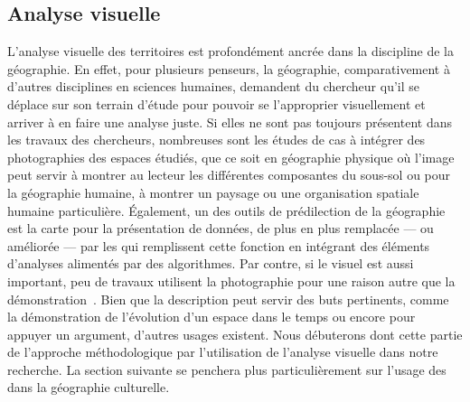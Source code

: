 \subsection{Analyse visuelle}
\label{sub:analyse_visuelle}
L'analyse visuelle des territoires est profondément ancrée dans la discipline de la géographie. 
En effet, pour plusieurs penseurs\missref{}, la géographie, comparativement à d'autres disciplines en sciences humaines, demandent du chercheur qu'il se déplace sur son terrain d'étude pour pouvoir se l'approprier visuellement et arriver à en faire une analyse juste. 
Si elles ne sont pas toujours présentent dans les travaux des chercheurs, nombreuses sont les études de cas à intégrer des photographies des espaces étudiés, que ce soit en géographie physique où l'image peut servir à montrer au lecteur les différentes composantes du sous-sol ou pour la géographie humaine, à montrer un paysage ou une organisation spatiale humaine particulière. 
Également, un des outils de prédilection de la géographie est la carte pour la présentation de données, de plus en plus remplacée --- ou améliorée --- par les \sig{} qui remplissent cette fonction en intégrant des éléments d'analyses alimentés par des algorithmes. 
Par contre, si le visuel est aussi important, peu de travaux utilisent la photographie pour une raison autre que la démonstration~\citep[151]{Rose2008}.
Bien que la description peut servir des buts pertinents, comme la démonstration de l'évolution d'un espace dans le temps ou encore pour appuyer un argument, d'autres usages existent\parencite[158]{Rose2008}. 
Nous débuterons dont cette partie de l'approche méthodologique par l'utilisation de l'analyse visuelle dans notre recherche. 
La section suivante se penchera plus particulièrement sur l'usage des \sig{} dans la géographie culturelle.

